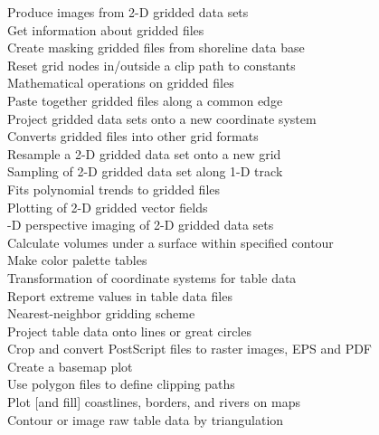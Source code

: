 \begin{tabbing}
	\>	Produce images from 2-D gridded data sets \\ 
	\>	Get information about gridded files \\ 
	\>	Create masking gridded files from shoreline data base \\ 
	\>	Reset grid nodes in/outside a clip path to constants \\ 
	\>	Mathematical operations on gridded files \\ 
	\>	Paste together gridded files along a common edge \\ 
	\>	Project gridded data sets onto a new coordinate system \\ 
	\>	Converts gridded files into other grid formats \\ 
	\>	Resample a 2-D gridded data set onto a new grid \\ 
	\>	Sampling of 2-D gridded data set along 1-D track \\ 
	\>	Fits polynomial trends to gridded files \\ 
	\>	Plotting of 2-D gridded vector fields \\ 
	-D perspective imaging of 2-D gridded data sets \\ 
	\>	Calculate volumes under a surface within specified contour \\ 
	\>	Make color palette tables \\ 
	\>	Transformation of coordinate systems for table data \\ 
	\>	Report extreme values in table data files \\ 
	\>	Nearest-neighbor gridding scheme \\ 
	\>	Project table data onto lines or great circles \\ 
	\>	Crop and convert PostScript files to raster images, EPS and PDF \\
	\>	Create a basemap plot \\ 
	\>	Use polygon files to define clipping paths \\ 
	\>	Plot [and fill] coastlines, borders, and rivers on maps \\ 
	\>	Contour or image raw table data by triangulation \\ 

\end{tabbing}
